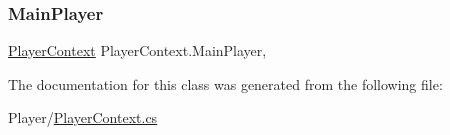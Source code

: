 \mbox{\label{class_player_context_aa06169a63098a442f0aeea9acd6e370a}} 
\subsubsection{\texorpdfstring{Main\+Player}{MainPlayer}}
{\footnotesize\ttfamily \mbox{\hyperlink{class_player_context}{Player\+Context}} Player\+Context.\+Main\+Player\hspace{0.3cm}{\ttfamily [static]}, {\ttfamily [get]}}



The documentation for this class was generated from the following file\+:\begin{DoxyCompactItemize}
\item 
Player/\mbox{\hyperlink{_player_context_8cs}{Player\+Context.\+cs}}\end{DoxyCompactItemize}
